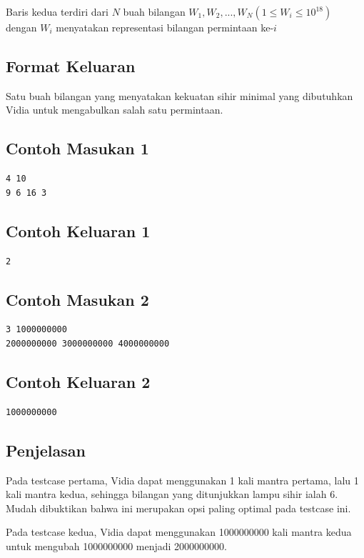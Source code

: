 \documentclass{article}
\begin{document}
Baris kedua terdiri dari $N$ buah bilangan $W_1, W_2, ..., W_N (1 \leq W_i \leq 10^{18})$ dengan $W_i$ menyatakan representasi bilangan permintaan ke-$i$

\subsection*{Format Keluaran}
Satu buah bilangan yang menyatakan kekuatan sihir minimal yang dibutuhkan Vidia untuk mengabulkan salah satu permintaan.

\begin{multicols}{2}
\subsection*{Contoh Masukan 1}
\begin{lstlisting}
4 10
9 6 16 3
\end{lstlisting}
\columnbreak

\subsection*{Contoh Keluaran 1}
\begin{lstlisting}
2
\end{lstlisting}
\vfill
\null
\end{multicols}

\begin{multicols}{2}
\subsection*{Contoh Masukan 2}
\begin{lstlisting}
3 1000000000
2000000000 3000000000 4000000000
\end{lstlisting}
\columnbreak

\subsection*{Contoh Keluaran 2}
\begin{lstlisting}
1000000000
\end{lstlisting}
\vfill
\null
\end{multicols}

\subsection*{Penjelasan}
Pada testcase pertama, Vidia dapat menggunakan 1 kali mantra pertama, lalu 1 kali mantra kedua, sehingga bilangan yang ditunjukkan lampu sihir ialah 6. Mudah dibuktikan bahwa ini merupakan opsi paling optimal pada testcase ini.

Pada testcase kedua, Vidia dapat menggunakan 1000000000 kali mantra kedua untuk mengubah 1000000000 menjadi 2000000000.
\end{document}

